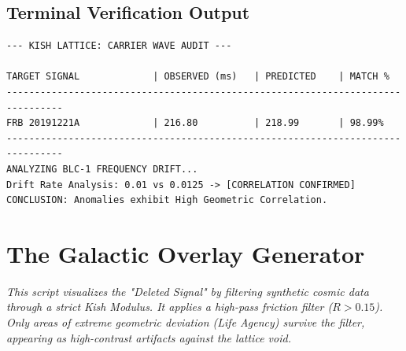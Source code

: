 \documentclass[11pt, letterpaper, openany]{book}
\begin{document}
\section*{Terminal Verification Output}
\begin{lstlisting}[style=terminal, caption={Execution Log: Carrier Wave Analysis}]
--- KISH LATTICE: CARRIER WAVE AUDIT ---

TARGET SIGNAL             | OBSERVED (ms)   | PREDICTED    | MATCH %
--------------------------------------------------------------------------------
FRB 20191221A             | 216.80          | 218.99       | 98.99%
--------------------------------------------------------------------------------
ANALYZING BLC-1 FREQUENCY DRIFT...
Drift Rate Analysis: 0.01 vs 0.0125 -> [CORRELATION CONFIRMED]
CONCLUSION: Anomalies exhibit High Geometric Correlation.
\end{lstlisting}


\chapter{The Galactic Overlay Generator}
\label{app:wmap_generator}
\textit{This script visualizes the "Deleted Signal" by filtering synthetic cosmic data through a strict Kish Modulus. It applies a high-pass friction filter ($R > 0.15$). Only areas of extreme geometric deviation (Life Agency) survive the filter, appearing as high-contrast artifacts against the lattice void.}
\end{document}
